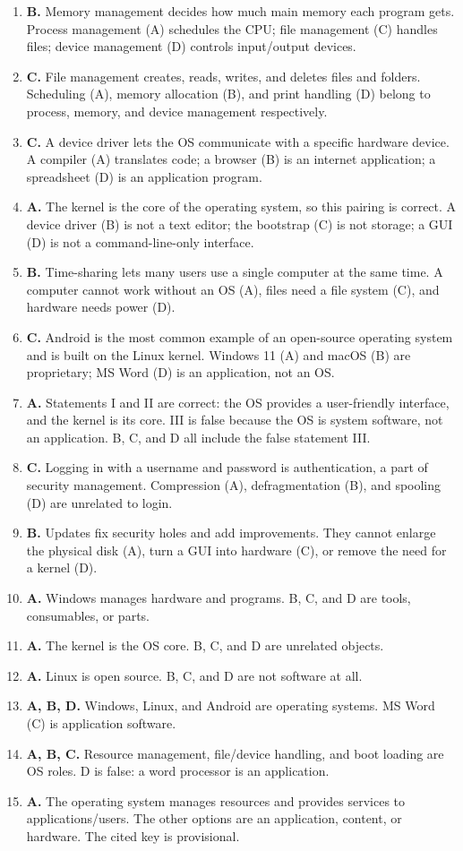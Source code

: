 \begin{enumerate}[label=\textbf{Q\arabic*.}, leftmargin=*]
\item \textbf{B.} Memory management decides how much main memory each program
  gets. Process management (A) schedules the CPU; file management (C) handles
  files; device management (D) controls input/output devices.
\item \textbf{C.} File management creates, reads, writes, and deletes files and
  folders. Scheduling (A), memory allocation (B), and print handling (D) belong
  to process, memory, and device management respectively.
\item \textbf{C.} A device driver lets the OS communicate with a specific
  hardware device. A compiler (A) translates code; a browser (B) is an
  internet application; a spreadsheet (D) is an application program.
\item \textbf{A.} The kernel is the core of the operating system, so this
  pairing is correct. A device driver (B) is not a text editor; the bootstrap
  (C) is not storage; a GUI (D) is not a command-line-only interface.
\item \textbf{B.} Time-sharing lets many users use a single computer at the
  same time. A computer cannot work without an OS (A), files need a file
  system (C), and hardware needs power (D).
\item \textbf{C.} Android is the most common example of an open-source
  operating system and is built on the Linux kernel. Windows 11 (A) and macOS
  (B) are proprietary; MS Word (D) is an application, not an OS.
\item \textbf{A.} Statements I and II are correct: the OS provides a
  user-friendly interface, and the kernel is its core. III is false because the
  OS is system software, not an application. B, C, and D all include the false
  statement III.
\item \textbf{C.} Logging in with a username and password is authentication, a
  part of security management. Compression (A), defragmentation (B), and
  spooling (D) are unrelated to login.
\item \textbf{B.} Updates fix security holes and add improvements. They cannot
  enlarge the physical disk (A), turn a GUI into hardware (C), or remove the
  need for a kernel (D).

\item \textbf{A.} Windows manages hardware and programs. B, C, and D are tools, consumables, or parts.
\item \textbf{A.} The kernel is the OS core. B, C, and D are unrelated objects.
\item \textbf{A.} Linux is open source. B, C, and D are not software at all.
\item \textbf{A, B, D.} Windows, Linux, and Android are operating systems. MS Word (C) is application software.
\item \textbf{A, B, C.} Resource management, file/device handling, and boot loading are OS roles. D is false: a word processor is an application.
\item \textbf{A.} The operating system manages resources and provides services to applications/users. The other options are an application, content, or hardware. The cited key is provisional.


\end{enumerate}
